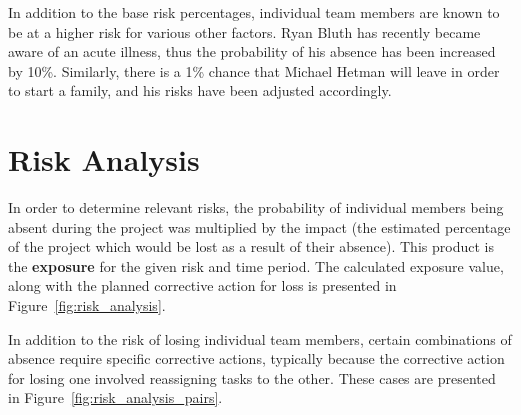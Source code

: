 \documentclass{GlobalDocument}
\begin{document}
In addition to the base risk percentages, individual team members are known to be at a higher risk for various other factors. Ryan Bluth has recently became aware of an acute illness, thus the probability of his absence has been increased by 10\%. Similarly, there is a 1\% chance that Michael Hetman will leave in order to start a family, and his risks have been adjusted accordingly.


\section{Risk Analysis}

In order to determine relevant risks, the probability of individual members being absent during the project was multiplied by the impact (the estimated percentage of the project which would be lost as a result of their absence). This product is the \textbf{exposure} for the given risk and time period. The calculated exposure value, along with the planned corrective action for loss is presented in Figure~\ref{fig:risk_analysis}.

In addition to the risk of losing individual team members, certain combinations of absence require specific corrective actions, typically because the corrective action for losing one involved reassigning tasks to the other. These cases are presented in Figure~\ref{fig:risk_analysis_pairs}.
\end{document}
